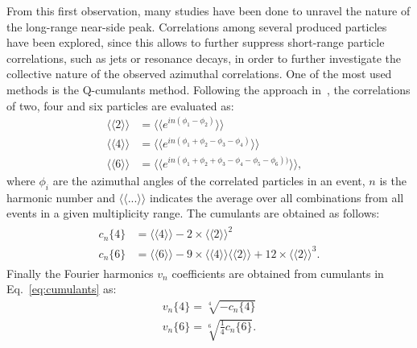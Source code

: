 From this first observation, many studies have been done to unravel the nature of the 
long-range near-side peak. Correlations among several produced particles have been explored, 
since this allows to further suppress short-range particle correlations, 
such as jets or resonance decays, in order to further investigate the collective nature 
of the observed azimuthal correlations. One of the most used methods is the 
Q-cumulants method. Following the approach in~\cite{Bilandzic:2010jr}, the 
correlations of two, four and six particles are evaluated as:
\begin{equation}
\label{correlations}
\begin{aligned}
\langle \langle 2 \rangle \rangle &= \langle \langle e^{in(\phi_1 -\phi_2)} \rangle \rangle &\\
\langle \langle 4 \rangle \rangle &= \langle \langle e^{in(\phi_1 + \phi_2 -\phi_3 - \phi_4)} \rangle \rangle &\\
\langle \langle 6 \rangle \rangle &= \langle \langle e^{in(\phi_1 + \phi_2 +\phi_3 - \phi_4- \phi_5- \phi_6))} \rangle \rangle,&
\end{aligned}
\end{equation}
where $\phi_i$ are the azimuthal angles of the correlated particles in an event, $n$ is the harmonic number and $\langle \langle ... \rangle \rangle$ indicates the average over all combinations from all events in a given multiplicity range. The cumulants are obtained as follows:
\begin{equation}
\label{eq:cumulants}
\begin{aligned}
\begin{split}
c_n\{4\} &= \langle \langle 4 \rangle \rangle - 2 \times  \langle \langle 2 \rangle \rangle^2 \\
c_n\{6\} &= \langle \langle 6 \rangle \rangle - 9 \times  \langle \langle 4 \rangle \rangle \langle \langle 2 \rangle \rangle + 12 \times \langle \langle 2 \rangle \rangle^3.
\end{split}
\end{aligned}
\end{equation}
Finally the Fourier harmonics $v_n$ coefficients are obtained from cumulants in Eq.~\ref{eq:cumulants} as:
\begin{equation}
\begin{aligned}
v_n \{4\} = \sqrt[4]{-c_n\{4\}} \\
v_n \{6\} = \sqrt[6]{\frac{1}{4}c_n\{6\}}.
\end{aligned}
\end{equation}
